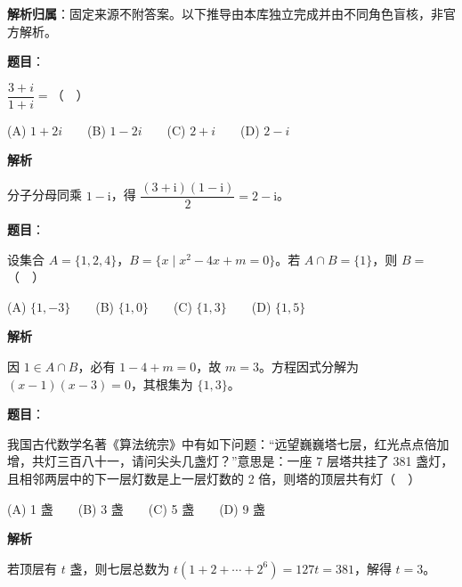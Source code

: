 

\begin{gknotice}
\textbf{解析归属}：固定来源不附答案。以下推导由本库独立完成并由不同角色盲核，非官方解析。
\end{gknotice}

\begin{answer}

\textbf{题目}：

\(\dfrac{3+i}{1+i}=\)（　）

   (A) \(1+2i\)　　(B) \(1-2i\)　　(C) \(2+i\)　　(D) \(2-i\)

\textbf{解析}

分子分母同乘 \(1-\mathrm i\)，得 \(\dfrac{(3+\mathrm i)(1-\mathrm i)}2=2-\mathrm i\)。


\end{answer}
\begin{answer}

\textbf{题目}：

设集合 \(A=\{1,2,4\}\)，\(B=\{x\mid x^2-4x+m=0\}\)。若 \(A\cap B=\{1\}\)，则 \(B=\)（　）

   (A) \(\{1,-3\}\)　　(B) \(\{1,0\}\)　　(C) \(\{1,3\}\)　　(D) \(\{1,5\}\)

\textbf{解析}

因 \(1\in A\cap B\)，必有 \(1-4+m=0\)，故 \(m=3\)。方程因式分解为 \((x-1)(x-3)=0\)，其根集为 \(\{1,3\}\)。


\end{answer}
\begin{answer}

\textbf{题目}：

我国古代数学名著《算法统宗》中有如下问题：“远望巍巍塔七层，红光点点倍加增，共灯三百八十一，请问尖头几盏灯？”意思是：一座 7 层塔共挂了 381 盏灯，且相邻两层中的下一层灯数是上一层灯数的 2 倍，则塔的顶层共有灯（　）

   (A) 1 盏　　(B) 3 盏　　(C) 5 盏　　(D) 9 盏

\textbf{解析}

若顶层有 \(t\) 盏，则七层总数为 \(t(1+2+\cdots+2^6)=127t=381\)，解得 \(t=3\)。


\end{answer}

